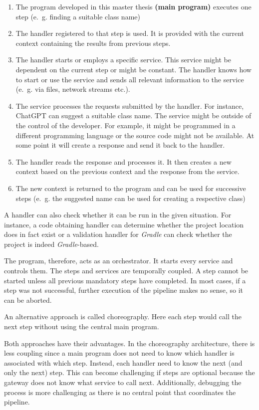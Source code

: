 \begin{enumerate}
    \item The program developed in this master thesis \textbf{(main program)} executes one step (e.~g. finding a suitable class name)
    \item The handler registered to that step is used. It is provided with the current context containing the results from previous steps.
    \item The handler starts or employs a specific service. This service might be dependent on the current step or might be constant. The handler knows how to start or use the service and sends all relevant information to the service (e.~g. via files, network streams etc.). 
    \item The service processes the requests submitted by the handler. For instance, ChatGPT can suggest a suitable class name. The service might be outside of the control of the developer. For example, it might be programmed in a different programming language or the source code might not be available. At some point it will create a response and send it back to the handler. 
    \item The handler reads the response and processes it. It then creates a new context based on the previous context and the response from the service. 
    \item The new context is returned to the program and can be used for successive steps (e.~g. the suggested name can be used for creating a respective class) 
\end{enumerate}



A handler can also check whether it can be run in the given situation. For instance, a code obtaining handler can determine whether the project location does in fact exist or a validation handler for \textit{Gradle} can check whether the project is indeed \textit{Gradle}-based.

The program, therefore, acts as an orchestrator. It starts every service and controls them. The steps and services are temporally coupled. A step cannot be started unless all previous mandatory steps have completed. In most cases, if a step was not successful, further execution of the pipeline makes no sense, so it can be aborted. 

An alternative approach is called choreography. Here each step would call the next step without using the central main program. 

Both approaches have their advantages. In the choreography architecture, there is less coupling since a main program does not need to know which handler is associated with which step. Instead, each handler need to know the next (and only the next) step. This can become challenging if steps are optional because the gateway does not know what service to call next. Additionally, debugging the process is more challenging as there is no central point that coordinates the pipeline.

